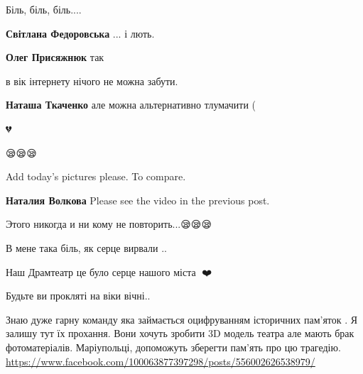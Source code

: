  
 
 
 
 

\qqSecCmt


Біль, біль, біль....

\begin{itemize} %
\textbf{Світлана Федоровська} ... і лють.

\textbf{Олег Присяжнюк} так
\end{itemize} %


в вік інтернету нічого не можна забути.

\begin{itemize} %
\textbf{Наташа Ткаченко} але можна альтернативно тлумачити (
\end{itemize} %

💔

😪😪😪


Add today's pictures please. To compare.

\begin{itemize} %
\textbf{Наталия Волкова} Please see the video in the previous post.
\end{itemize} %


Этого никогда и ни кому не повторить...😪😪😪


В мене така біль, як серце вирвали ..

Наш Драмтеатр це було серце нашого міста 🥲❤️

Будьте ви прокляті на віки вічні..


Знаю дуже гарну команду яка займається оцифруванням історичних пам'яток . Я
залишу тут їх прохання. Вони хочуть зробити 3D модель театра але мають брак
фотоматеріалів. Маріупольці, допоможуть зберегти пам'ять про цю трагедію.
\url{https://www.facebook.com/100063877397298/posts/556002626538979/}

